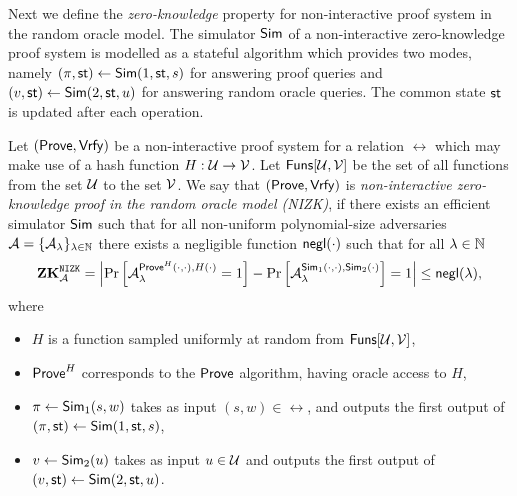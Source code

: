 Next we define the \emph{zero-knowledge} property for non-interactive proof system in the random oracle model. The simulator $\mathsf{Sim}$ of a non-interactive zero-knowledge proof system is modelled as a stateful algorithm which provides two modes, namely $(\pi, \mathsf{st}) \leftarrow \mathsf{Sim}(1, \mathsf{st}, s)$  for answering proof queries and $(v, \mathsf{st}) \leftarrow \mathsf{Sim}(2, \mathsf{st}, u)$ for answering random oracle queries. The common state $\mathsf{st}$ is updated after each operation.



\begin{definition}
Let $(\mathsf{Prove}, \allowbreak \mathsf{Vrfy})$ be a non-interactive proof system for a relation $\rel$ which may make use of a hash function $H : \mathcal{U} \rightarrow \mathcal{V}$. Let $\mathsf{Funs}[\mathcal{U}, \mathcal{V}]$ be the set of all functions from the set $\mathcal{U}$ to the set $\mathcal{V}$. We say that $(\mathsf{Prove}, \mathsf{Vrfy})$ is \emph{non-interactive zero-knowledge proof in the random oracle model (NIZK)}, if there exists an efficient simulator $\mathsf{Sim}$ such that for all non-uniform polynomial-size adversaries $\mathcal{A} = \{\mathcal{A}_{\lambda}\}_{\lambda \in \mathbb{N}}$ there exists a negligible function $\mathsf{negl}(\cdot)$ such that for all $\lambda \in \mathbb{N}$ 
\[\mathbf{ZK}_{\mathcal{A}}^{\mathtt{NIZK}} = 
\left| \Pr\left[ \mathcal{A}_{\lambda}^{\mathsf{Prove}^H(\cdot, \cdot), H(\cdot)} = 1 \right] -  \Pr\left[\mathcal{A}_{\lambda}^{\mathsf{Sim}_1(\cdot, \cdot), \mathsf{Sim}_2(\cdot)} \right] = 1 \right|
\leq \mathsf{negl}(\lambda),
\]
where 
\begin{itemize}
\item $H$ is a function sampled uniformly at random from $\mathsf{Funs}[\mathcal{U}, \mathcal{V}]$,
\item $\mathsf{Prove}^H$ corresponds to the $\mathsf{Prove}$ algorithm, having oracle access to $H$,
\item $\pi \leftarrow \mathsf{Sim}_1(s, w)$ takes as input $(s, w) \in \rel$, and outputs the first output of $(\pi, \mathsf{st}) \leftarrow \mathsf{Sim}(1, \mathsf{st}, s)$,
\item $v \leftarrow \mathsf{Sim}_2(u)$ takes as input $u \in \mathcal{U}$ and outputs the first output of $(v, \mathsf{st}) \leftarrow \mathsf{Sim}(2, \mathsf{st}, u)$.
\end{itemize}
\end{definition}

